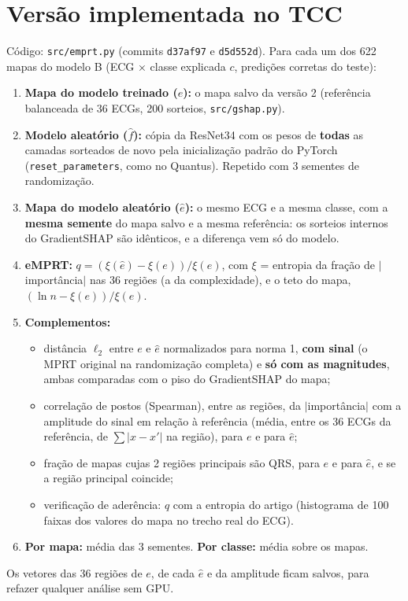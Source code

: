 \documentclass[11pt,a4paper]{article}
\begin{document}
\section{Versão implementada no TCC}\label{sec:versao}
Código: \texttt{src/emprt.py} (commits \texttt{d37af97} e \texttt{d5d552d}). Para cada um dos 622 mapas do modelo B (ECG × classe explicada $c$, predições corretas do teste):
\begin{enumerate}
\item \textbf{Mapa do modelo treinado ($e$):} o mapa salvo da versão 2 (referência balanceada de 36 ECGs, 200 sorteios, \texttt{src/gshap.py}).
\item \textbf{Modelo aleatório ($\hat{f}$):} cópia da ResNet34 com os pesos de \textbf{todas} as camadas sorteados de novo pela inicialização padrão do PyTorch (\texttt{reset\_parameters}, como no Quantus). Repetido com 3 sementes de randomização.
\item \textbf{Mapa do modelo aleatório ($\hat{e}$):} o mesmo ECG e a mesma classe, com a \textbf{mesma semente} do mapa salvo e a mesma referência: os sorteios internos do GradientSHAP são idênticos, e a diferença vem só do modelo.
\item \textbf{eMPRT:} $q = (\xi(\hat{e}) - \xi(e))/\xi(e)$, com $\xi$ = entropia da fração de $|$importância$|$ nas 36 regiões (a da complexidade), e o teto do mapa, $(\ln n - \xi(e))/\xi(e)$.
\item \textbf{Complementos:}
\begin{itemize}
\item distância $\ell_2$ entre $e$ e $\hat{e}$ normalizados para norma 1, \textbf{com sinal} (o MPRT original na randomização completa) e \textbf{só com as magnitudes}, ambas comparadas com o piso do GradientSHAP do mapa;
\item correlação de postos (Spearman), entre as regiões, da $|$importância$|$ com a amplitude do sinal em relação à referência (média, entre os 36 ECGs da referência, de $\sum |x - x'|$ na região), para $e$ e para $\hat{e}$;
\item fração de mapas cujas 2 regiões principais são QRS, para $e$ e para $\hat{e}$, e se a região principal coincide;
\item verificação de aderência: $q$ com a entropia do artigo (histograma de 100 faixas dos valores do mapa no trecho real do ECG).
\end{itemize}
\item \textbf{Por mapa:} média das 3 sementes. \textbf{Por classe:} média sobre os mapas.
\end{enumerate}
Os vetores das 36 regiões de $e$, de cada $\hat{e}$ e da amplitude ficam salvos, para refazer qualquer análise sem GPU.
\end{document}
